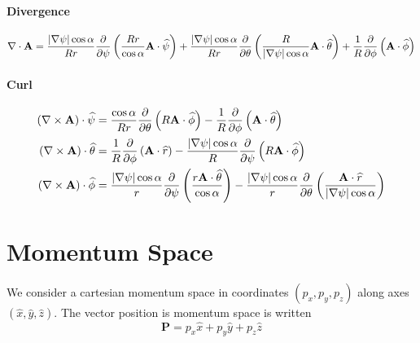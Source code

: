 \paragraph{Divergence}

\begin{equation}
\nabla\cdot\mathbf{A}=\frac{\left| \nabla\psi\right| \cos\alpha}{Rr}\frac{
\partial}{\partial\psi}\left( \frac{Rr}{\cos\alpha}\mathbf{A}\cdot \widehat{%
\psi}\right) +\frac{\left| \nabla\psi\right| \cos\alpha}{Rr}\frac{\partial}{%
\partial\theta}\left( \frac{R}{\left| \nabla\psi\right| \cos\alpha}\mathbf{A}%
\cdot\widehat{\theta}\right) +\frac{1}{R}\frac{ \partial}{\partial\phi}%
\left( \mathbf{A}\cdot\widehat{\phi}\right)  \label{psithetadiv}
\end{equation}

\paragraph{Curl}

\begin{align}
\left( \nabla \times \mathbf{A}\right) \cdot \widehat{\psi }& =\frac{\cos
\alpha }{Rr}\frac{\partial }{\partial \theta }\left( R\mathbf{A}\cdot 
\widehat{\phi }\right) -\frac{1}{R}\frac{\partial }{\partial \phi }\left( 
\mathbf{A}\cdot \widehat{\theta }\right)  \\
\left( \nabla \times \mathbf{A}\right) \cdot \widehat{\theta }& =\frac{1}{R}%
\frac{\partial }{\partial \phi }\left( \mathbf{A}\cdot \widehat{r}\right) -%
\frac{\left\vert \nabla \psi \right\vert \cos \alpha }{R}\frac{\partial }{%
\partial \psi }\left( R\mathbf{A}\cdot \widehat{\phi }\right)  \\
\left( \nabla \times \mathbf{A}\right) \cdot \widehat{\phi }& =\frac{%
\left\vert \nabla \psi \right\vert \cos \alpha }{r}\frac{\partial }{\partial
\psi }\left( \frac{r\mathbf{A}\cdot \widehat{\theta }}{\cos \alpha }\right) -%
\frac{\left\vert \nabla \psi \right\vert \cos \alpha }{r}\frac{\partial }{%
\partial \theta }\left( \frac{\mathbf{A}\cdot \widehat{r}}{\left\vert \nabla
\psi \right\vert \cos \alpha }\right) 
\end{align}

\section{Momentum Space}

We consider a cartesian momentum space in coordinates $\left(
p_{x},p_{y},p_{z}\right) $ along axes $\left( \widehat{x},\widehat{y},%
\widehat {z}\right) $. The vector position is momentum space is written 
\begin{equation}
\mathbf{P}=p_{x}\widehat{x}+p_{y}\widehat{y}+p_{z}\widehat{z}
\end{equation}

